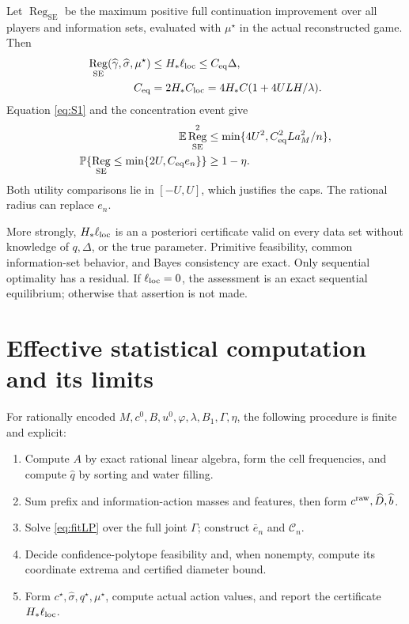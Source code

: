 \documentclass[11pt,a4paper]{article}
\numberwithin{equation}{section}
\theoremstyle{definition}
\newcommand{\E}{\mathbb E}
\newcommand{\Prob}{\mathbb P}
\DeclareMathOperator{\SE}{SE}
\DeclareMathOperator{\Reg}{Reg}
\begin{document}
Let \(\Reg_{\SE}\) be the maximum positive full continuation improvement
over all players and information sets, evaluated with \(\mu^\star\)
in the actual reconstructed game. Then
\begin{equation}\label{eq:S20}
 \begin{split}
 \Reg_{\SE}(\widehat\gamma,\widehat\sigma,\mu^\star)
   &\le H_*\ell_{\rm loc}\le C_{\rm eq}\Delta,\\
 C_{\rm eq}&=2H_*C_{\rm loc}
       =4H_*C(1+4ULH/\lambda).
 \end{split}
\end{equation}
Equation \eqref{eq:S1} and the concentration event give
\begin{align}
 \E\Reg_{\SE}^2
       &\le\min\{4U^2,C_{\rm eq}^2La_M^2/n\},\label{eq:S21}\\
 \Prob\{\Reg_{\SE}\le\min\{2U,C_{\rm eq}e_n\}\}
       &\ge1-\eta .\label{eq:S22}
\end{align}
Both utility comparisons lie in \([-U,U]\), which justifies the caps.
The rational radius can replace \(e_n\).

More strongly, \(H_*\ell_{\rm loc}\) is an a posteriori certificate
valid on every data set without knowledge of \(q,\Delta\), or the
true parameter. Primitive feasibility, common information-set
behavior, and Bayes consistency are exact. Only sequential optimality
has a residual. If \(\ell_{\rm loc}=0\), the assessment is an exact
sequential equilibrium; otherwise that assertion is not made.

\section{Effective statistical computation and its limits}
\label{sec:statcomputation}
For rationally encoded \(M,c^0,B,u^0,\varphi,\lambda,B_1,\Gamma,\eta\),
the following procedure is finite and explicit:
\begin{enumerate}
\item Compute \(A\) by exact rational linear algebra, form the
cell frequencies, and compute \(\widehat q\) by sorting and water filling.
\item Sum prefix and information-action masses and features, then form
\(c^{\rm raw},\widehat D,\widehat b\).
\item Solve \eqref{eq:fitLP} over the full joint \(\Gamma\);
construct \(\bar e_n\) and \(\mathcal C_n\).
\item Decide confidence-polytope feasibility and, when nonempty,
compute its coordinate extrema and certified diameter bound.
\item Form \(c^\star,\widehat\sigma,q^\star,\mu^\star\), compute actual
action values, and report the certificate \(H_*\ell_{\rm loc}\).
\end{enumerate}
\end{document}
